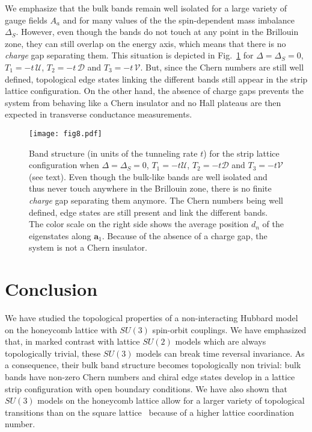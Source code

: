 \documentclass[aps,pra,showpacs,twocolumn,superscriptaddress]{revtex4-1}
\begin{document}
We emphasize that the bulk bands remain well isolated for a large variety of 
gauge fields $A_a$ and for many values of the the spin-dependent mass imbalance $\Delta_S$. 
However, even though the bands do not touch at any point in the Brillouin zone, 
they can still overlap on the energy axis, which means that there is no  \textit{charge} gap 
separating them. This situation is depicted in Fig.~\ref{fig:nonisbands} for 
$\Delta=\Delta_S=0$, $T_1=-t \,\mathcal{U}$, $T_2=-t \, \mathcal{D}$ and 
$T_3=-t \, \mathcal{V}$. But, since the Chern numbers are still well defined, 
topological edge states linking the different bands still appear in the strip 
lattice configuration. On the other hand, the absence of charge gaps prevents 
the system from behaving like a Chern insulator and no Hall plateaus are then 
expected in transverse conductance measurements. 


\begin{figure}[t!p]
	\texttt{[image: fig8.pdf]}
	\caption{\label{fig:nonisbands} Band structure (in units of the tunneling rate $t$) 
	for the strip lattice configuration when 
	$\Delta=\Delta_S=0$, $T_1=-t\mathcal{U}$, $T_2=-t\mathcal{D}$ and $T_3=-t\mathcal{V}$ (see text).
	Even though the bulk-like bands are well isolated and thus never touch anywhere in the Brillouin zone,  
there is no finite \textit{charge} gap separating them anymore. 
The Chern numbers being well defined, edge  states are still present and link the different bands. 
The color scale on the right side shows the average position $d_n$ of the 
eigenstates along $\mathbf{a}_1$. Because of the absence of a charge gap, 
the system is not a Chern insulator. }
\end{figure}



	

\section{Conclusion}
\label{sec:conclusion}
We have studied the topological properties
of a non-interacting Hubbard model on the honeycomb lattice with $SU(3)$ spin-orbit couplings. 
We have emphasized that, in marked contrast with lattice $SU(2)$ models which are 
always topologically trivial, these $SU(3)$ models can break time reversal invariance. 
As a consequence, their bulk band structure becomes topologically non trivial: 
bulk bands have non-zero Chern numbers and chiral edge states develop in a lattice strip configuration with open boundary conditions. 
We have also shown that $SU(3)$ models on the honeycomb lattice allow for a larger variety of topological transitions than on the square lattice~\cite{Barnett2012} because of a higher lattice coordination number. 
\end{document}
